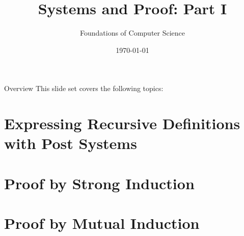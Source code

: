 \documentclass[style=sailor,size=12pt]{powerdot}
\title{Systems and Proof: Part I}
\author{Foundations of Computer Science}
\date{\today}
\begin{document}
\maketitle
\begin{slide}[toc=,bm=]{Overview}
This slide set covers the following topics:

\vspace{5mm}
\tableofcontents[content=sections]
\end{slide}

\section[slide=true]{Expressing Recursive Definitions with Post Systems} 


\section[slide=true]{Proof by Strong Induction}


\section[slide=true]{Proof by Mutual Induction}

\end{document}
